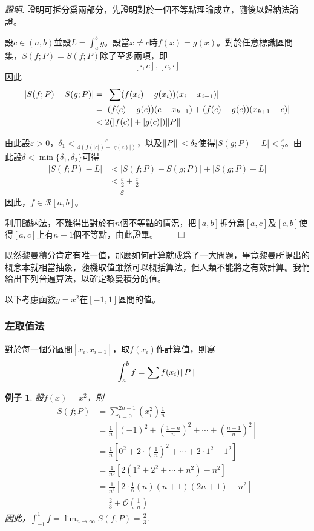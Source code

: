 \documentclass[12pt]{article}
\newtheorem*{example}{例子}
\renewenvironment*{proof}{\textit{證明.}}{\hfill$\qed$}
\begin{document}
    \begin{proof}
        證明可拆分爲兩部分，先證明對於一個不等點理論成立，隨後以歸納法論證。

        設$c\in(a,b)$並設$L=\int_a^b g$。設當$x\neq c$時$f(x)=g(x)$。對於任意標識區間集，$S(f;P)=S(f;P)$除了至多兩項，即$$[\cdot,c], [c,\cdot]$$因此\begin{align*}
            |S(f;P)-S(g;P)|&=|\sum (f(x_i)-g(x_i))(x_i-x_{i-1})|\\
            &=|(f(c)-g(c))(c-x_{k-1})+(f(c)-g(c))(x_{k+1}-c)|\\
            &<2(|f(c)|+|g(c)|)\norm*{P}
        \end{align*}

        由此設$\varepsilon>0$，$\delta_1<\frac{\varepsilon}{4(f(|c|)+|g(c)|)}$，以及$\norm*{P}<\delta_2$使得$|S(g;P)-L|<\frac{\varepsilon}{2}$。由此設$\delta<\min\{\delta_1,\delta_2\}$可得\begin{align*}
            |S(f;P)-L|&<|S(f;P)-S(g;P)|+|S(g;P)-L|\\
            &<\frac{\varepsilon}{2}+\frac{\varepsilon}{2}\\
            &=\varepsilon
        \end{align*}
        因此，$f\in\mathcal{R}[a,b]$。

        利用歸納法，不難得出對於有$n$個不等點的情況，把$[a,b]$拆分爲$[a,c]$及$[c,b]$使得$[a,c]$上有$n-1$個不等點，由此證畢。
    \end{proof}

    既然黎曼積分肯定有唯一值，那麽如何計算就成爲了一大問題，畢竟黎曼所提出的概念本就相當抽象，隨機取值雖然可以概括算法，但人類不能將之有效計算。我們給出下列普遍算法，以確定黎曼積分的值。

    以下考慮函數$y=x^2$在$[-1,1]$區間的值。

    \subsubsection*{左取值法}

    對於每一個分區間$[x_i,x_{i+1}]$，取$f(x_i)$作計算值，則寫$$\int_a^b f=\sum f(x_i)\norm*{P}$$

    \begin{example}
        設$f(x)=x^2$，則\begin{align*}
            S(f;P)&=\sum_{i=0}^{2n-1} (x_i^2) \frac{1}{n}\\
            &=\frac{1}{n}[(-1)^2+(\frac{1-n}{n})^2+\cdots+(\frac{n-1}{n})^2]\\
            &=\frac{1}{n}[0^2+2\cdot (\frac{1}{n})^2+\cdots+2\cdot 1^2 - 1^2]\\
            &=\frac{1}{n^3}[2(1^2+2^2+\cdots +n^2)-n^2]\\
            &=\frac{1}{n^3}[2\cdot \frac{1}{6}(n)(n+1)(2n+1)-n^2]\\
            &=\frac{2}{3}+\mathcal{O}(\frac{1}{n})
        \end{align*}
        因此，$\displaystyle\int_{-1}^1 f = \lim_{n\to \infty}S(f;P)=\frac{2}{3}$.
    \end{example}
\end{document}
